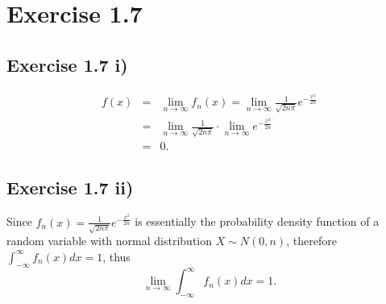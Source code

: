 \documentclass[final,3p,authoryear]{elsarticle}
\begin{document}
\section{Exercise 1.7}
	\subsection{Exercise 1.7 i)}
		\begin{eqnarray}
			f(x) &=& \lim\limits_{n \to \infty} f_n(x) = \lim\limits_{n \to \infty} \frac{1}{\sqrt{2n\pi}} e^{-\frac{x^2}{2n}}
			\nonumber\\
			&=& \lim\limits_{n \to \infty} \frac{1}{\sqrt{2n\pi}} \cdot \lim\limits_{n \to \infty} e^{-\frac{x^2}{2n}}
			\nonumber\\
			&=& 0
			.
		\end{eqnarray}
		
	\subsection{Exercise 1.7 ii)}
		Since $f_n(x)=\frac{1}{\sqrt{2n\pi}} e^{-\frac{x^2}{2n}}$ is essentially the probability density function of a random variable with normal distribution $X \sim N(0,n)$, therefore $\int_{-\infty}^{\infty} f_n(x) dx = 1$, thus
		\begin{equation}
			\lim\limits_{n \to \infty} \int_{-\infty}^{\infty} f_n(x) dx = 1
			.
		\end{equation}
		
\end{document}
